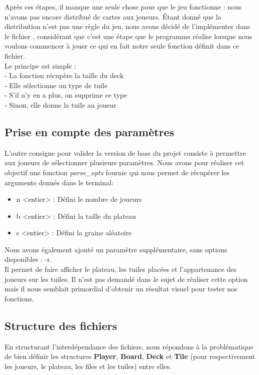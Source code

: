 \documentclass[a4paper]{article}
\begin{document}
Après ces étapes, il manque une seule chose pour que le jeu fonctionne : nous n'avons pas encore distribué de cartes aux joueurs.
Étant donné que la distribution n'est pas une règle du jeu, nous avons décidé de l'implémenter dans le fichier , considérant que c'est une étape que le programme réalise lorsque nous voulons commencer à jouer ce qui en fait notre seule fonction définit dans ce fichier. \\

Le principe est simple : \\
- La fonction récupère la taille du deck \\
- Elle sélectionne un type de tuile \\
- S'il n'y en a plus, on supprime ce type \\
- Sinon, elle donne la tuile au joueur \\


\subsection{Prise en compte des paramètres}
L'autre consigne pour valider la version de base du projet consiste à permettre aux joueurs de sélectionner plusieurs paramètres. Nous avons pour réaliser cet objectif une fonction \emph{parse\_opts} fournie qui nous permet de récupérer les arguments donnés dans le terminal:
\begin{itemize}
    \item n <entier> : Défini le nombre de joueurs
    \item b <entier> : Défini la taille du plateau
    \item s <entier> : Défini la graine aléatoire
\end{itemize}

Nous avons également ajouté un paramètre supplémentaire, sans options disponibles : -r. \\ 
Il permet de faire afficher le plateau, les tuiles placées et l'appartenance des joueurs sur les tuiles.
Il n'est pas demandé dans le sujet de réaliser cette option mais il nous semblait primordial d'obtenir un résultat visuel pour tester nos fonctions. \\

\subsection{Structure des fichiers}
En structurant l'interdépendance des fichiers, nous répondons à la problématique de bien définir les structures \textbf{Player}, \textbf{Board}, \textbf{Deck} et \textbf{Tile} (pour respectivement les joueurs, le plateau, les files et les tuiles) entre elles. \\
\end{document}
